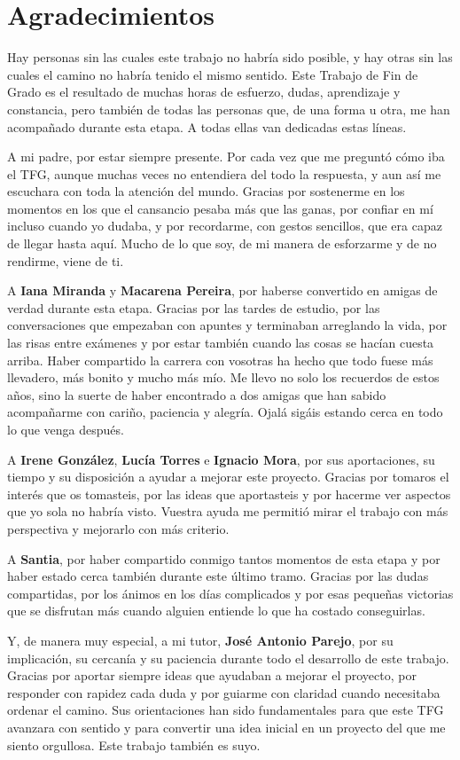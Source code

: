 \chapter*{Agradecimientos}

Hay personas sin las cuales este trabajo no habría sido posible, y hay otras sin las cuales el camino no habría tenido el mismo sentido. Este Trabajo de Fin de Grado es el resultado de muchas horas de esfuerzo, dudas, aprendizaje y constancia, pero también de todas las personas que, de una forma u otra, me han acompañado durante esta etapa. A todas ellas van dedicadas estas líneas.

A mi padre, por estar siempre presente. Por cada vez que me preguntó cómo iba el TFG, aunque muchas veces no entendiera del todo la respuesta, y aun así me escuchara con toda la atención del mundo. Gracias por sostenerme en los momentos en los que el cansancio pesaba más que las ganas, por confiar en mí incluso cuando yo dudaba, y por recordarme, con gestos sencillos, que era capaz de llegar hasta aquí. Mucho de lo que soy, de mi manera de esforzarme y de no rendirme, viene de ti.

A \textbf{Iana Miranda} y \textbf{Macarena Pereira}, por haberse convertido en amigas de verdad durante esta etapa. Gracias por las tardes de estudio, por las conversaciones que empezaban con apuntes y terminaban arreglando la vida, por las risas entre exámenes y por estar también cuando las cosas se hacían cuesta arriba. Haber compartido la carrera con vosotras ha hecho que todo fuese más llevadero, más bonito y mucho más mío. Me llevo no solo los recuerdos de estos años, sino la suerte de haber encontrado a dos amigas que han sabido acompañarme con cariño, paciencia y alegría. Ojalá sigáis estando cerca en todo lo que venga después.

A \textbf{Irene González}, \textbf{Lucía Torres} e \textbf{Ignacio Mora}, por sus aportaciones, su tiempo y su disposición a ayudar a mejorar este proyecto. Gracias por tomaros el interés que os tomasteis, por las ideas que aportasteis y por hacerme ver aspectos que yo sola no habría visto. Vuestra ayuda me permitió mirar el trabajo con más perspectiva y mejorarlo con más criterio.

A \textbf{Santia}, por haber compartido conmigo tantos momentos de esta etapa y por haber estado cerca también durante este último tramo. Gracias por las dudas compartidas, por los ánimos en los días complicados y por esas pequeñas victorias que se disfrutan más cuando alguien entiende lo que ha costado conseguirlas.

Y, de manera muy especial, a mi tutor, \textbf{José Antonio Parejo}, por su implicación, su cercanía y su paciencia durante todo el desarrollo de este trabajo. Gracias por aportar siempre ideas que ayudaban a mejorar el proyecto, por responder con rapidez cada duda y por guiarme con claridad cuando necesitaba ordenar el camino. Sus orientaciones han sido fundamentales para que este TFG avanzara con sentido y para convertir una idea inicial en un proyecto del que me siento orgullosa. Este trabajo también es suyo.
